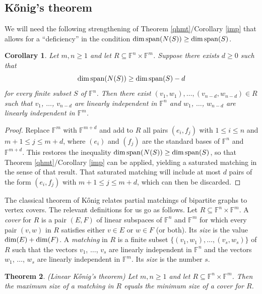 \documentclass{amsart}
\newtheorem{thm}{Theorem}[section]
\newtheorem{cor}[thm]{Corollary}
\theoremstyle{definition}
\begin{document}
\subsection{Kőnig's theorem}

We will need the following strengthening of Theorem \ref{qhmt}/Corollary \ref{imp} that allows for a ``deficiency'' in the condition ${\rm dim}\, {\rm span}(N(S)) \geq {\rm dim}\, {\rm span}(S)$.

\begin{cor}\label{dqhmt}
Let $m,n \geq 1$ and let $R \subseteq \mathbb{F}^n \times \mathbb{F}^m$. Suppose there exists $d \geq 0$ such that $${\rm dim}\, {\rm span}(N(S)) \geq {\rm dim}\, {\rm span}(S) - d$$ for every finite subset $S$ of $\mathbb{F}^n$. Then there exist $(v_1,w_1), \ldots, (v_{n-d},w_{n-d}) \in R$ such that $v_1$, $\ldots$, $v_{n-d}$ are linearly independent in $\mathbb{F}^n$ and $w_1$, $\ldots$, $w_{n-d}$ are linearly independent in $\mathbb{F}^m$.
\end{cor}

\begin{proof} 
Replace $\mathbb{F}^m$ with $\mathbb{F}^{m+d}$ and add to $R$ all pairs $(e_i, f_j)$ with $1 \leq i \leq n$ and $m+1 \leq j \leq m + d$, where $(e_i)$ and $(f_j)$ are the standard bases of $\mathbb{F}^n$ and $\mathbb{F}^{m+d}$. This restores the inequality ${\rm dim}\, {\rm span}(N(S)) \geq {\rm dim}\, {\rm span}(S)$, so that Theorem \ref{qhmt}/Corollary \ref{imp} can be applied, yielding a saturated matching in the sense of that result. That saturated matching will include at most $d$ pairs of the form $(e_i,f_j)$ with $m+1 \leq j \leq m + d$, which can then be discarded.
\end{proof}

The classical theorem of Kőnig \cite{konig} relates partial matchings of bipartite graphs to vertex covers. The relevant definitions for us go as follows. Let $R \subseteq \mathbb{F}^n \times \mathbb{F}^m$. A {\it cover} for $R$ is a pair $(E,F)$ of linear subspaces of $\mathbb{F}^n$ and $\mathbb{F}^m$ for which every pair $(v,w)$ in $R$ satisfies either $v \in E$ or $w \in F$ (or both). Its {\it size} is the value ${\rm dim}(E) + {\rm dim}(F)$. A {\it matching} in $R$ is a finite subset $\{(v_1, w_1), \ldots, (v_s, w_s)\}$ of $R$ such that the vectors $v_1$, $\ldots$, $v_s$ are linearly independent in $\mathbb{F}^n$ and the vectors $w_1$, $\ldots$, $w_s$ are linearly independent in $\mathbb{F}^m$. Its {\it size} is the number $s$.

\begin{thm}\label{qkt} (Linear Kőnig's theorem)
Let $m,n \geq 1$ and let $R \subseteq \mathbb{F}^n \times \mathbb{F}^m$. Then the maximum size of a matching in $R$ equals the minimum size of a cover for $R$.
\end{thm}
\end{document}
